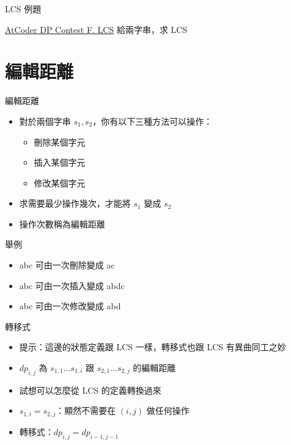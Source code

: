\documentclass[aspectratio=169]{beamer}
\begin{document}
    \begin{frame}{LCS 例題}
        \begin{block}{\href{https://atcoder.jp/contests/dp/tasks/dp_f}{AtCoder DP Contest F. LCS}}
            給兩字串，求 LCS
        \end{block}
    \end{frame}

    \section{編輯距離}

    \begin{frame}{編輯距離}
        \begin{itemize}
            \item 對於兩個字串 $s_1, s_2$，你有以下三種方法可以操作：
            \begin{itemize}
                \item 刪除某個字元
                \item 插入某個字元
                \item 修改某個字元
            \end{itemize}
            \item 求需要最少操作幾次，才能將 $s_1$ 變成 $s_2$
            \item 操作次數稱為編輯距離
        \end{itemize}
    \end{frame}

    \begin{frame}{舉例}
        \begin{itemize}
            \item abc 可由一次刪除變成 ac
            \item abc 可由一次插入變成 abdc
            \item abc 可由一次修改變成 abd
        \end{itemize}
    \end{frame}

    \begin{frame}{轉移式}
        \begin{itemize}
            \item<1-> 提示：這邊的狀態定義跟 LCS 一樣，轉移式也跟 LCS 有異曲同工之妙
            \item<1-> $dp_{i, j}$ 為 $s_{1, 1} \dots s_{1, i}$ 跟 $s_{2, 1} \dots s_{2, j}$ 的編輯距離
            \item<1-> 試想可以怎麼從 LCS 的定義轉換過來
            \item<2-> $s_{1, i} = s_{2, j}$：顯然不需要在 $(i, j)$ 做任何操作
            \item<2-> 轉移式：$dp_{i, j} = dp_{i - 1, j - 1}$
        \end{itemize}
    \end{frame}
\end{document}
